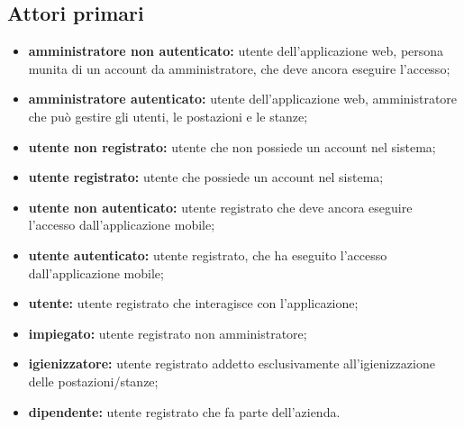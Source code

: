\subsection{Attori primari}
\begin{itemize}
    \item \textbf{amministratore non autenticato:} utente dell'applicazione web, persona munita di un account da amministratore, che deve ancora eseguire l'accesso;
    \item \textbf{amministratore autenticato:} utente dell'applicazione web, amministratore che pu\`{o} gestire gli utenti, le postazioni e le stanze;
    \item \textbf{utente non registrato:} utente che non possiede un account nel sistema;
    \item \textbf{utente registrato:} utente che possiede un account nel sistema;
    \item \textbf{utente non autenticato:} utente registrato che deve ancora eseguire l'accesso dall'applicazione mobile;
    \item \textbf{utente autenticato:} utente registrato, che ha eseguito l'accesso dall'applicazione mobile;
    \item \textbf{utente:} utente registrato che interagisce con l'applicazione;
    \item \textbf{impiegato:} utente registrato non amministratore;
    \item \textbf{igienizzatore:} utente registrato addetto esclusivamente all'igienizzazione delle postazioni/stanze;
    \item \textbf{dipendente:} utente registrato che fa parte dell'azienda.
\end{itemize}
